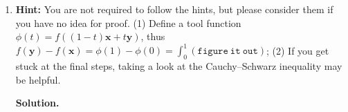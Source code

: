 \documentclass{article}
\theoremstyle{definition}
\theoremstyle{remark}
\newenvironment{Q}
        {%
          \clearpage
          \item
        }
        {%
          \phantom{s} %
          \bigskip
          \textbf{Solution.}
        }
\begin{document}
\begin{enumerate}[font={\Large\bfseries},left=0pt]
\begin{Q}
\begin{enumerate}
\begin{enumerate}
    \textbf{Hint:} You are not required to follow the hints, but please consider them if you have no idea for proof. (1) Define a tool function $\phi(t)=f((1-t)\bm{x}+t\bm{y})$, thus $f(\bm{y})-f(\bm{x})=\phi(1)-\phi(0)=\int_{0}^{1}(\mathtt{figure\ it\ out})$; (2) If you get stuck at the final steps, taking a look at the Cauchy–Schwarz inequality may be helpful.
    
    \end{enumerate}
\end{enumerate}


\end{Q}
\begin{tcolorbox}

\end{tcolorbox}

    \end{enumerate}
\end{document}
